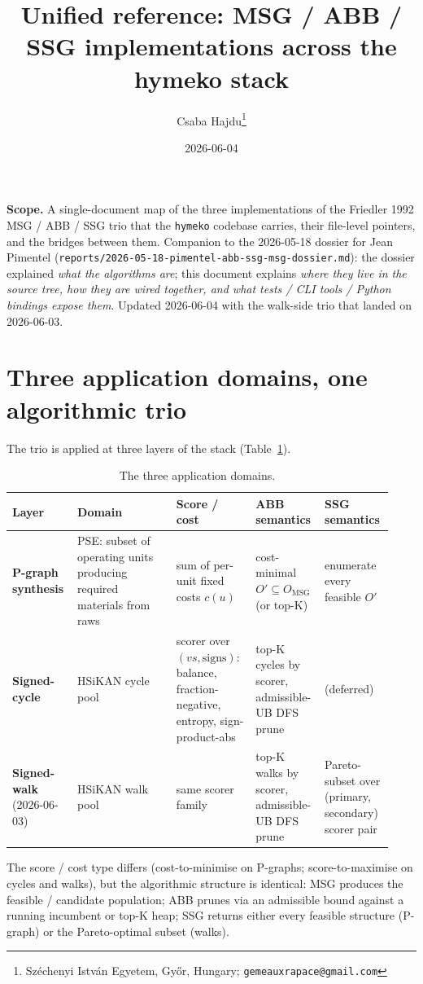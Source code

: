\documentclass[11pt]{article}
\title{%
  Unified reference: MSG / ABB / SSG implementations across the
  hymeko stack%
}
\author{%
  Csaba Hajdu\thanks{Sz\'echenyi Istv\'an Egyetem, Gy\H{o}r, Hungary; \texttt{gemeauxrapace@gmail.com}}%
}
\date{2026-06-04}
\begin{document}
\maketitle

\noindent\textbf{Scope.} A single-document map of the three
implementations of the Friedler 1992 MSG / ABB / SSG trio that the
\texttt{hymeko} codebase carries, their file-level pointers, and the
bridges between them. Companion to the 2026-05-18 dossier for Jean
Pimentel (\texttt{reports/2026-05-18-pimentel-abb-ssg-msg-dossier.md}):
the dossier explained \emph{what the algorithms are}; this document
explains \emph{where they live in the source tree, how they are wired
together, and what tests / CLI tools / Python bindings expose them}.
Updated 2026-06-04 with the walk-side trio that landed on 2026-06-03.

\section{Three application domains, one algorithmic trio}

The trio is applied at three layers of the stack
(Table~\ref{tab:domains}).

\begin{table}[h]
\centering
\small
\begin{tabular}{p{0.16\linewidth}p{0.25\linewidth}p{0.20\linewidth}p{0.16\linewidth}p{0.16\linewidth}}
\toprule
Layer & Domain & Score / cost & ABB semantics & SSG semantics \\
\midrule
\textbf{P-graph synthesis} & PSE: subset of operating units producing required materials from raws & sum of per-unit fixed costs $c(u)$ & cost-minimal $O' \subseteq O_\mathrm{MSG}$ (or top-K) & enumerate every feasible $O'$ \\
\textbf{Signed-cycle} & HSiKAN cycle pool & scorer over $(vs, \mathrm{signs})$: balance, fraction-negative, entropy, sign-product-abs & top-K cycles by scorer, admissible-UB DFS prune & (deferred) \\
\textbf{Signed-walk} (2026-06-03) & HSiKAN walk pool & same scorer family & top-K walks by scorer, admissible-UB DFS prune & Pareto-subset over (primary, secondary) scorer pair \\
\bottomrule
\end{tabular}
\caption{The three application domains.}
\label{tab:domains}
\end{table}

The score / cost type differs (cost-to-minimise on P-graphs;
score-to-maximise on cycles and walks), but the algorithmic structure
is identical: MSG produces the feasible / candidate population; ABB
prunes via an admissible bound against a running incumbent or top-K
heap; SSG returns either every feasible structure (P-graph) or the
Pareto-optimal subset (walks).
\end{document}
